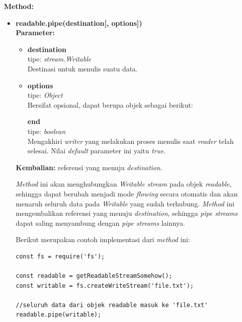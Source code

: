 \documentclass[a4paper,twoside]{article}
\begin{document}
\begin{enumerate}
\begin{enumerate}
\begin{enumerate}
\begin{itemize}
\begin{itemize}
						
					\end{itemize}
					
					\textbf{Method:}
					\begin{itemize}
						\item \textbf{readable.pipe(destination[, options])} \\ \textbf{Parameter:}
						\begin{itemize}
							\item \textbf{destination} \\tipe: \textit{stream.Writable} \\ Destinasi untuk menulis suatu data.
							\item \textbf{options} \\tipe: \textit{Object} \\ Bersifat opsional, dapat berupa objek sebagai berikut:
							
								\textbf{end} \\tipe: \textit{boolean} \\ Mengakhiri \textit{writer} yang melakukan proses menulis saat \textit{reader} telah selesai. Nilai \textit{default} parameter ini yaitu \textit{true}.
							
						\end{itemize}
						\textbf{Kembalian:} referensi yang menuju \textit{destination}.
						
						\textit{Method} ini akan menghubungkan \textit{Writable stream} pada objek \textit{readable}, sehingga dapat berubah menjadi mode \textit{flowing} secara otomatis dan akan menaruh seluruh data pada \textit{Writable} yang sudah terhubung. \textit{Method} ini mengembalikan referensi yang menuju \textit{destination}, sehingga \textit{pipe streams} dapat saling menyambung dengan \textit{pipe streams} lainnya.
						
						Berikut merupakan contoh implementasi dari \textit{method} ini:
\begin{lstlisting}
const fs = require('fs');
						
const readable = getReadableStreamSomehow();
const writable = fs.createWriteStream('file.txt');
						
//seluruh data dari objek readable masuk ke 'file.txt'
readable.pipe(writable); 
\end{lstlisting}
						
					\end{itemize}
				\end{itemize}
			\end{enumerate}
			

\end{enumerate}
\end{enumerate}
\end{document}
